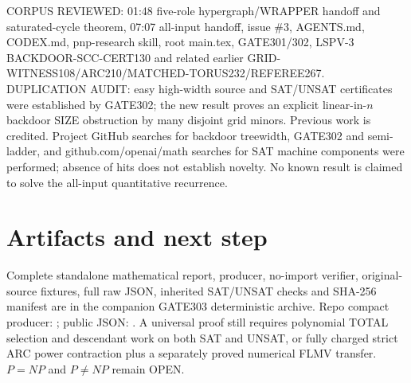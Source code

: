 \documentclass[11pt]{article}
\begin{document}
CORPUS REVIEWED: 01:48 five-role hypergraph/WRAPPER handoff and saturated-cycle theorem, 07:07 all-input handoff, issue \#3, AGENTS.md, CODEX.md, pnp-research skill, root main.tex, GATE301/302, LSPV-3 BACKDOOR-SCC-CERT130 and related earlier GRID-WITNESS108/ARC210/MATCHED-TORUS232/REFEREE267. DUPLICATION AUDIT: easy high-width source and SAT/UNSAT certificates were established by GATE302; the new result proves an explicit linear-in-$n$ backdoor SIZE obstruction by many disjoint grid minors. Previous work is credited. Project GitHub searches for backdoor treewidth, GATE302 and semi-ladder, and github.com/openai/math searches for SAT machine components were performed; absence of hits does not establish novelty. No known result is claimed to solve the all-input quantitative recurrence.

\section*{Artifacts and next step}
Complete standalone mathematical report, producer, no-import verifier, original-source fixtures, full raw JSON, inherited SAT/UNSAT checks and SHA-256 manifest are in the companion GATE303 deterministic archive. Repo compact producer: ; public JSON: . A universal proof still requires polynomial TOTAL selection and descendant work on both SAT and UNSAT, or fully charged strict ARC power contraction plus a separately proved numerical FLMV transfer. $P=NP$ and $P\ne NP$ remain OPEN.
\end{document}
